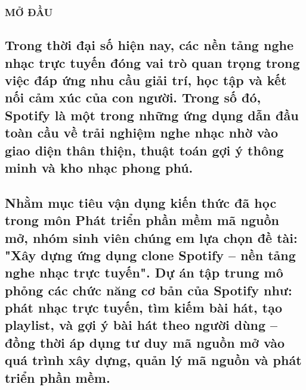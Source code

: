 \documentclass{article}
\begin{document}
\subsubsection{\texorpdfstring{\textbf{MỞ
ĐẦU}}{MỞ ĐẦU}}\label{mux1edf-ux111ux1ea7u}

\subsection{Trong thời đại số hiện nay, các nền tảng nghe nhạc trực
tuyến đóng vai trò quan trọng trong việc đáp ứng nhu cầu giải trí, học
tập và kết nối cảm xúc của con người. Trong số đó, Spotify là một trong
những ứng dụng dẫn đầu toàn cầu về trải nghiệm nghe nhạc nhờ vào giao
diện thân thiện, thuật toán gợi ý thông minh và kho nhạc phong
phú.}\label{trong-thux1eddi-ux111ux1ea1i-sux1ed1-hiux1ec7n-nay-cuxe1c-nux1ec1n-tux1ea3ng-nghe-nhux1ea1c-trux1ef1c-tuyux1ebfn-ux111uxf3ng-vai-truxf2-quan-trux1ecdng-trong-viux1ec7c-ux111uxe1p-ux1ee9ng-nhu-cux1ea7u-giux1ea3i-truxed-hux1ecdc-tux1eadp-vuxe0-kux1ebft-nux1ed1i-cux1ea3m-xuxfac-cux1ee7a-con-ngux1b0ux1eddi.-trong-sux1ed1-ux111uxf3-spotify-luxe0-mux1ed9t-trong-nhux1eefng-ux1ee9ng-dux1ee5ng-dux1eabn-ux111ux1ea7u-touxe0n-cux1ea7u-vux1ec1-trux1ea3i-nghiux1ec7m-nghe-nhux1ea1c-nhux1edd-vuxe0o-giao-diux1ec7n-thuxe2n-thiux1ec7n-thuux1eadt-touxe1n-gux1ee3i-uxfd-thuxf4ng-minh-vuxe0-kho-nhux1ea1c-phong-phuxfa.}

\subsection{Nhằm mục tiêu vận dụng kiến thức đã học trong môn Phát triển
phần mềm mã nguồn mở, nhóm sinh viên chúng em lựa chọn đề tài: "Xây dựng
ứng dụng clone Spotify -- nền tảng nghe nhạc trực tuyến". Dự án tập
trung mô phỏng các chức năng cơ bản của Spotify như: phát nhạc trực
tuyến, tìm kiếm bài hát, tạo playlist, và gợi ý bài hát theo người dùng
-- đồng thời áp dụng tư duy mã nguồn mở vào quá trình xây dựng, quản lý
mã nguồn và phát triển phần
mềm.}\label{nhux1eb1m-mux1ee5c-tiuxeau-vux1eadn-dux1ee5ng-kiux1ebfn-thux1ee9c-ux111uxe3-hux1ecdc-trong-muxf4n-phuxe1t-triux1ec3n-phux1ea7n-mux1ec1m-muxe3-nguux1ed3n-mux1edf-nhuxf3m-sinh-viuxean-chuxfang-em-lux1ef1a-chux1ecdn-ux111ux1ec1-tuxe0i-xuxe2y-dux1ef1ng-ux1ee9ng-dux1ee5ng-clone-spotify-nux1ec1n-tux1ea3ng-nghe-nhux1ea1c-trux1ef1c-tuyux1ebfn.-dux1ef1-uxe1n-tux1eadp-trung-muxf4-phux1ecfng-cuxe1c-chux1ee9c-nux103ng-cux1a1-bux1ea3n-cux1ee7a-spotify-nhux1b0-phuxe1t-nhux1ea1c-trux1ef1c-tuyux1ebfn-tuxecm-kiux1ebfm-buxe0i-huxe1t-tux1ea1o-playlist-vuxe0-gux1ee3i-uxfd-buxe0i-huxe1t-theo-ngux1b0ux1eddi-duxf9ng-ux111ux1ed3ng-thux1eddi-uxe1p-dux1ee5ng-tux1b0-duy-muxe3-nguux1ed3n-mux1edf-vuxe0o-quuxe1-truxecnh-xuxe2y-dux1ef1ng-quux1ea3n-luxfd-muxe3-nguux1ed3n-vuxe0-phuxe1t-triux1ec3n-phux1ea7n-mux1ec1m.}
\end{document}
